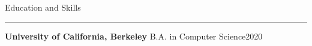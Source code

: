 

  {\sectionfont Education and Skills\vspace{2pt}\hrule}

  \vspace{5pt}
  \textbf{University of California, Berkeley}%
  \quad{}B.A. in Computer Science\quad{}2020






